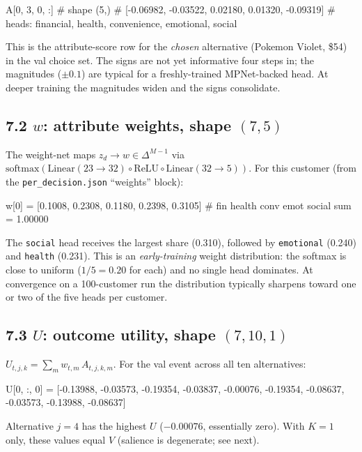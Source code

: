 \documentclass[11pt,a4paper]{article}
\begin{document}
\begin{code}
A[0, 3, 0, :]                  # shape (5,)
# [-0.06982, -0.03522,  0.02180,  0.01320, -0.09319]
# heads:  financial, health, convenience, emotional, social
\end{code}

This is the attribute-score row for the \emph{chosen} alternative
(Pokemon Violet, \$54) in the val choice set. The signs are not yet
informative four steps in; the magnitudes ($\pm 0.1$) are typical for
a freshly-trained MPNet-backed head. At deeper training the magnitudes
widen and the signs consolidate.

\subsection*{7.2 $w$: attribute weights, shape $(7, 5)$}

The weight-net maps $z_d \to w \in \Delta^{M-1}$ via
$\text{softmax}(\text{Linear}(23 \to 32) \circ \text{ReLU} \circ
\text{Linear}(32 \to 5))$. For this customer (from the
\texttt{per\_decision.json} ``weights'' block):

\begin{code}
w[0] = [0.1008, 0.2308, 0.1180, 0.2398, 0.3105]
#        fin     health  conv   emot    social       sum = 1.00000
\end{code}

The \texttt{social} head receives the largest share (0.310), followed
by \texttt{emotional} (0.240) and \texttt{health} (0.231). This is an
\emph{early-training} weight distribution: the softmax is close to
uniform ($1/5 = 0.20$ for each) and no single head dominates. At
convergence on a 100-customer run the distribution typically sharpens
toward one or two of the five heads per customer.

\subsection*{7.3 $U$: outcome utility, shape $(7, 10, 1)$}

$U_{t, j, k} = \sum_m w_{t, m}\, A_{t, j, k, m}$. For the val event
across all ten alternatives:

\begin{code}
U[0, :, 0] =
[-0.13988, -0.03573, -0.19354, -0.03837, -0.00076,
 -0.19354, -0.08637, -0.03573, -0.13988, -0.08637]
\end{code}

Alternative $j = 4$ has the highest $U$ ($-0.00076$, essentially
zero). With $K = 1$ only, these values equal $V$ (salience is
degenerate; see next).
\end{document}
